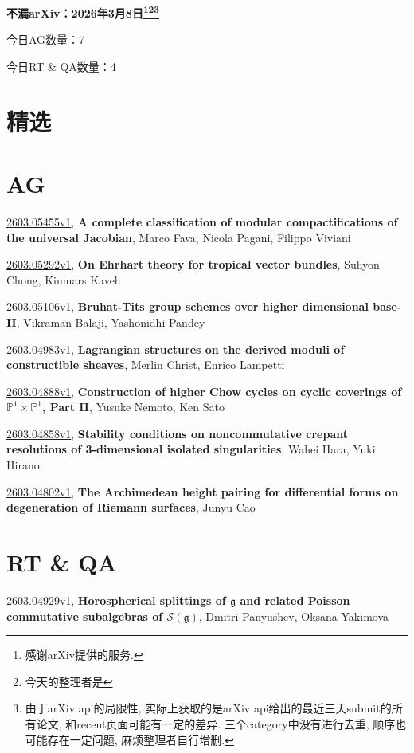 \documentclass[9pt, a4paper]{article}
\theoremstyle{plain}
\theoremstyle{definition}
\theoremstyle{remark}
\newcommand{\arxiv}[3]{\href{https://arxiv.org/abs/#1}{#1}, \textbf{\textcolor{arxivblue}{#2}}, #3}
\newcommand{\AGnumber}{7}
\newcommand{\RTQAnumber}{4}
\newcommand{\NewestDate}{2026年3月8日}
\newcommand{\todayarXiver}{} %
\begin{document}
\begin{center}
    \Huge\textbf{不漏arXiv：\NewestDate\footnote{感谢arXiv提供的服务.}\footnote{今天的整理者是\todayarXiver}\footnote{由于arXiv api的局限性, 实际上获取的是arXiv api给出的最近三天submit的所有论文, 和recent页面可能有一定的差异. 三个category中没有进行去重, 顺序也可能存在一定问题, 麻烦整理者自行增删.}} \\
\end{center}

\setcounter{section}{-1}

\begin{center}
    今日AG数量：\AGnumber
    
    今日RT \& QA数量：\RTQAnumber
    
\end{center}


\section{精选}


\section{AG}
\arxiv{2603.05455v1}{A complete classification of modular compactifications of the universal Jacobian}{Marco Fava, Nicola Pagani, Filippo Viviani}

\arxiv{2603.05292v1}{On Ehrhart theory for tropical vector bundles}{Suhyon Chong, Kiumars Kaveh}

\arxiv{2603.05106v1}{Bruhat-Tits group schemes over higher dimensional base-II}{Vikraman Balaji, Yashonidhi Pandey}

\arxiv{2603.04983v1}{Lagrangian structures on the derived moduli of constructible sheaves}{Merlin Christ, Enrico Lampetti}

\arxiv{2603.04888v1}{Construction of higher Chow cycles on cyclic coverings of $\mathbb{P}^1 \times \mathbb{P}^1$, Part II}{Yusuke Nemoto, Ken Sato}

\arxiv{2603.04858v1}{Stability conditions on noncommutative crepant resolutions of 3-dimensional isolated singularities}{Wahei Hara, Yuki Hirano}

\arxiv{2603.04802v1}{The Archimedean height pairing for differential forms on degeneration of Riemann surfaces}{Junyu Cao}


\section{RT \& QA}
\arxiv{2603.04929v1}{Horospherical splittings of $\mathfrak g$ and related Poisson commutative subalgebras of $\mathcal S(\mathfrak g)$}{Dmitri Panyushev, Oksana Yakimova}
\end{document}
